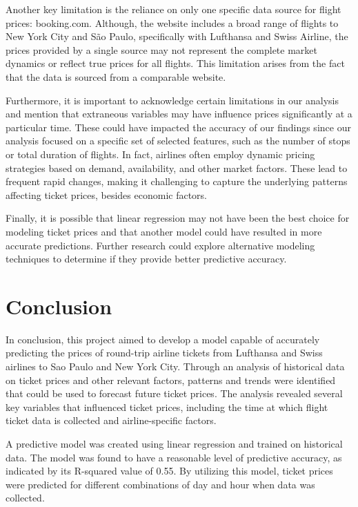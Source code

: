 Another key limitation is the reliance on only one specific data source for flight prices: booking.com.
Although, the website includes a broad range of flights to New York City and São Paulo, specifically with Lufthansa and Swiss Airline, the prices provided by a single source may not represent the complete market dynamics or reflect true prices for all flights.
This limitation arises from the fact that the data is sourced from a comparable website.

Furthermore, it is important to acknowledge certain limitations in our analysis and mention that extraneous variables may have influence prices significantly at a particular time.
These could have impacted the accuracy of our findings since our analysis focused on a specific set of selected features, such as the number of stops or total duration of flights.
In fact, airlines often employ dynamic pricing strategies based on demand, availability, and other market factors.
These lead to frequent rapid changes, making it challenging to capture the underlying patterns affecting ticket prices, besides economic factors.

Finally, it is possible that linear regression may not have been the best choice for modeling ticket prices and that another model could have resulted in more accurate predictions.
Further research could explore alternative modeling techniques to determine if they provide better predictive accuracy.

\section{Conclusion}
\label{chap:conclusion}
In conclusion, this project aimed to develop a model capable of accurately predicting the prices of round-trip airline tickets from Lufthansa and Swiss airlines to Sao Paulo and New York City.
Through an analysis of historical data on ticket prices and other relevant factors, patterns and trends were identified that could be used to forecast future ticket prices.
The analysis revealed several key variables that influenced ticket prices, including the time at which flight ticket data is collected and airline-specific factors.

A predictive model was created using linear regression and trained on historical data. 
The model was found to have a reasonable level of predictive accuracy, as indicated by its R-squared value of 0.55.
By utilizing this model, ticket prices were predicted for different combinations of day and hour when data was collected.

